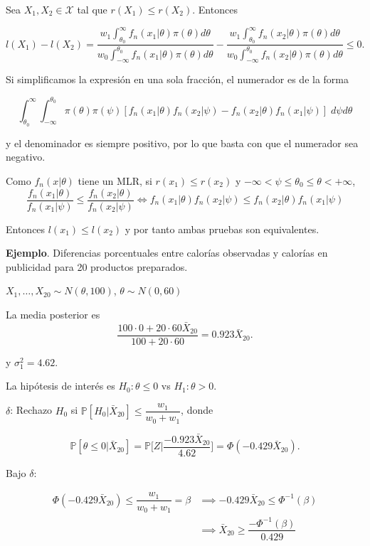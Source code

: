 \documentclass[
  12pt,
]{book}
\begin{document}
Sea \(X_1,X_2\in \mathcal X\) tal que \(r(X_1)\leq r(X_2)\). Entonces

\[l(X_1)-l(X_2) =\dfrac{w_1 \displaystyle\int_{\theta_0}^\infty f_n(x_1|\theta)\pi(\theta)d\theta}{w_0 \displaystyle\int_{-\infty}^{\theta_0} f_n(x_1|\theta)\pi(\theta)d\theta} -\dfrac{w_1 \displaystyle\int_{\theta_0}^\infty f_n(x_2|\theta)\pi(\theta)d\theta}{w_0 \displaystyle\int_{-\infty}^{\theta_0} f_n(x_2|\theta)\pi(\theta)d\theta}\leq 0. \]

Si simplificamos la expresión en una sola fracción, el numerador es de la forma

\[\int_{\theta_0}^\infty\int_{-\infty}^{\theta_0}\pi(\theta)\pi(\psi)[f_n(x_1|\theta)f_n(x_2|\psi)-f_n(x_2|\theta)f_n(x_1|\psi)]\;d\psi d\theta\]

y el denominador es siempre positivo, por lo que basta con que el numerador sea negativo.

Como \(f_n(x|\theta)\) tiene un MLR, si \(r(x_1)\leq r(x_2)\) y \(-\infty <\psi\leq \theta_0\leq \theta<+\infty\),
\[\dfrac{f_n(x_1|\theta)}{f_n(x_1|\psi)}\leq\dfrac{f_n(x_2|\theta)}{f_n(x_2|\psi)} \Leftrightarrow f_n(x_1|\theta)f_n(x_2|\psi)\leq f_n(x_2|\theta)f_n(x_1|\psi)  \]

Entonces \(l(x_1)\leq l(x_2)\) y por tanto ambas pruebas son equivalentes.

\textbf{Ejemplo}. Diferencias porcentuales entre calorías observadas y calorías en publicidad para 20 productos preparados.

\(X_1,\dots,X_{20}\sim N(\theta,100)\), \(\theta\sim N(0,60)\)

La media posterior es
\[\dfrac{100\cdot 0 + 20\cdot 60\bar X_{20}}{100+20\cdot 60} = 0.923\bar X_{20}.\]

y \(\sigma_1^2 = 4.62\).

La hipótesis de interés es \(H_0:\theta\leq 0\) vs \(H_1:\theta>0\).

\(\delta\): Rechazo \(H_0\) si \(\mathbb P[H_0|\bar X_{20}]\leq \dfrac{w_1}{w_0+w_1}\), donde

\[\mathbb P[\theta\leq 0|\bar X_{20}] = \mathbb P\bigg[Z\bigg|\dfrac{-0.923\bar X_{20}}{4.62}\bigg] = \Phi(-0.429\bar X_{20}).\]

Bajo \(\delta\):

\begin{align*}
\Phi(-0.429\bar X_{20})\leq \dfrac{w_1}{w_0+w_1}=\beta & \implies -0.429\bar X_{20}\leq \Phi^{-1}(\beta)\\
&\implies \bar X_{20} \geq \dfrac{-\Phi^{-1}(\beta)}{0.429}
\end{align*}
\end{document}
